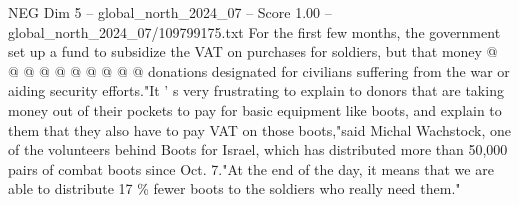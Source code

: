 \begin{textsample}{NEG Dim 5 – global\_north\_2024\_07 – Score 1.00 – global\_north\_2024\_07/109799175.txt}
For the first few months, the government set up a fund to subsidize the VAT on purchases for soldiers, but that money @ @ @ @ @ @ @ @ @ @ donations designated for civilians suffering from the war or aiding security efforts."It ' s very frustrating to explain to donors that are taking money out of their pockets to pay for basic equipment like boots, and explain to them that they also have to pay VAT on those boots,"said Michal Wachstock, one of the volunteers behind Boots for Israel, which has distributed more than 50,000 pairs of combat boots since Oct. 7."At the end of the day, it means that we are able to distribute 17 \% fewer boots to the soldiers who really need them."

\end{textsample}
